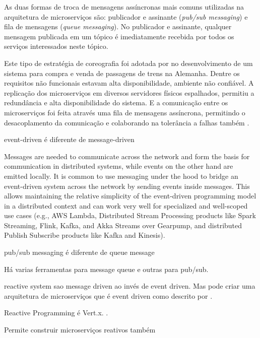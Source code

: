 \documentclass[12pt]{article}
\theoremstyle{plain}
\begin{document}
As duas formas de troca de mensagens assíncronas mais comuns utilizadas na arquitetura de microserviços são: publicador e assinante (\textit{pub/sub messaging}) e fila de mensagens (\textit{queue messaging}). No publicador e assinante, qualquer mensagem publicada em um tópico é imediatamente recebida por todos os serviços interessados neste tópico\cite{aws-pub-sub:2018}. 

Este tipo de estratégia de coreografia foi adotada por \cite{richter:2017} no desenvolvimento de um sistema para compra e venda de passagens de trens na Alemanha. Dentre os requisitos não funcionais estavam alta disponibilidade, ambiente não confiável. A replicação dos microserviços em diversos servidores físicos espalhados, permitiu a redundância e alta disponibilidade do sistema. E a comunicação entre os microserviços foi feita através uma fila de mensagens assíncrona, permitindo o desacoplamento da comunicação e colaborando na tolerância a falhas também \cite{richter:2017}.

event-driven é diferente de message-driven \cite{reactive-manifesto:2014, boner:2016}

Messages are needed to communicate across the network and form the basis for communication in distributed systems, while events on the other hand are emitted locally. It is common to use messaging under the hood to bridge an event-driven system across the network by sending events inside messages. This allows maintaining the relative simplicity of the event-driven programming model in a distributed context and can work very well for specialized and well-scoped use cases (e.g., AWS Lambda, Distributed Stream Processing products like Spark Streaming, Flink, Kafka, and Akka Streams over Gearpump, and distributed Publish Subscribe products like Kafka and Kinesis). \cite{boner:2016}

pub/sub messaging \cite{aws-pub-sub:2018} é diferente de queue message \cite{aws-message-queue:2018}

Há varias ferramentas para message queue e outras para pub/sub.



reactive system sao message driven ao invés de event driven. Mas pode criar uma arquitetura de microserviços que é event driven como descrito por \cite{damore:2018, boner:2016}.

Reactive Programming é Vert.x. \cite{boner:2016}. 

Permite construir microserviços reativos também \cite{Fetzer:2017}
\end{document}
